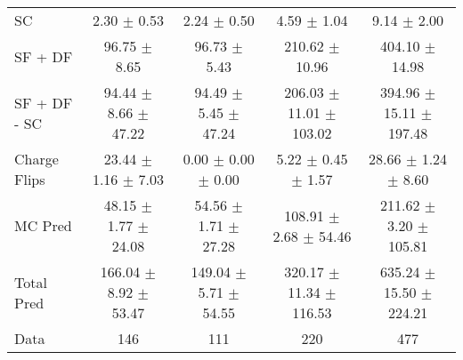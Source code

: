 \begin{tabular}{l|cccc}
                                 SC &  2.30 $\pm$  0.53 &  2.24 $\pm$  0.50 &  4.59 $\pm$  1.04 &  9.14 $\pm$  2.00 \\
                            SF + DF & 96.75 $\pm$  8.65 & 96.73 $\pm$  5.43 & 210.62 $\pm$ 10.96 & 404.10 $\pm$ 14.98 \\
\hline
                       SF + DF - SC & 94.44 $\pm$  8.66 $\pm$ 47.22 & 94.49 $\pm$  5.45 $\pm$ 47.24 & 206.03 $\pm$ 11.01 $\pm$ 103.02 & 394.96 $\pm$ 15.11 $\pm$ 197.48 \\
\hline\hline
                       Charge Flips & 23.44 $\pm$  1.16 $\pm$  7.03 &  0.00 $\pm$  0.00 $\pm$  0.00 &  5.22 $\pm$  0.45 $\pm$  1.57 & 28.66 $\pm$  1.24 $\pm$  8.60 \\
\hline
                            MC Pred & 48.15 $\pm$  1.77 $\pm$ 24.08 & 54.56 $\pm$  1.71 $\pm$ 27.28 & 108.91 $\pm$  2.68 $\pm$ 54.46 & 211.62 $\pm$  3.20 $\pm$ 105.81 \\
\hline
                         Total Pred & 166.04 $\pm$  8.92 $\pm$ 53.47 & 149.04 $\pm$  5.71 $\pm$ 54.55 & 320.17 $\pm$ 11.34 $\pm$ 116.53 & 635.24 $\pm$ 15.50 $\pm$ 224.21 \\
\hline\hline
                               Data &   146 &   111 &   220 &   477 \\
\hline\hline
\end{tabular}

